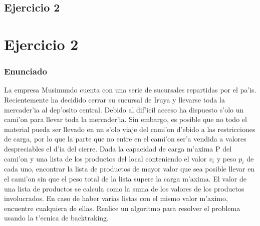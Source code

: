 \chapter{Ejercicio 2 }
\part{Ejercicio 2}
\section{Enunciado}
La empresa Musimundo cuenta con una serie de sucursales repartidas por el pa'is. Recientemente ha decidido cerrar su sucursal
de Iruya y llevarse toda la mercader'ia al dep'osito central. Debido al dif'icil acceso ha dispuesto s'olo un cami'on para
llevar toda la mercader'ia. Sin embargo, es posible que no todo el material pueda ser llevado en un s'olo viaje del cami'on
d'ebido a las restricciones de carga, por lo que la parte que no entre en el cami'on ser'a vendida a valores despreciables el
 d'ia del cierre.
Dada la capacidad de carga m'axima P del cami'on y una lista de los productos del local conteniendo el valor $v_i$ y peso $p_i$ 
de cada uno, encontrar la lista de productos de mayor valor que sea posible llevar en el cami'on sin que el peso total de la
lista supere la carga m'axima. El valor de una lista de productos se calcula como la suma de los valores de los productos
involucrados. En caso de haber varias listas con el mismo valor m'aximo, encuentre cualquiera de ellas.
Realice un algoritmo para resolver el problema usando la t'ecnica de backtraking.

